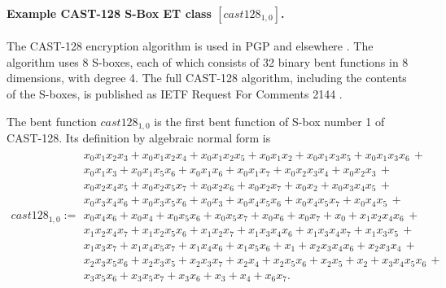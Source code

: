 \documentclass[12pt,a4paper]{article}
\begin{document}
\newpage
\paragraph*{Example CAST-128 S-Box ET class $[cast128_{1,0}]$.}

The CAST-128 encryption algorithm is used in PGP and elsewhere \cite{Ada97}.
The algorithm uses 8 S-boxes, each of which consists of 32 binary bent functions in 8 dimensions,
with degree 4.
The full CAST-128 algorithm, including the contents of the S-boxes,
is published as IETF Request For Comments 2144 \cite{RFC2144}.

The bent function $cast128_{1,0}$ is the first bent function of S-box number 1 of CAST-128.
Its definition by algebraic normal form is
\footnotesize{}
\begin{align*}
cast128_{1,0} :=
\begin{array}{l}
x_{0} x_{1} x_{2} x_{3} + x_{0} x_{1} x_{2} x_{4} + x_{0} x_{1} x_{2} x_{5} + x_{0} x_{1} x_{2} + x_{0} x_{1} x_{3} x_{5} + x_{0} x_{1} x_{3} x_{6}\, +
\\
x_{0} x_{1} x_{3} + x_{0} x_{1} x_{5} x_{6} + x_{0} x_{1} x_{6} + x_{0} x_{1} x_{7} + x_{0} x_{2} x_{3} x_{4} + x_{0} x_{2} x_{3}\, +
\\
x_{0} x_{2} x_{4} x_{5} + x_{0} x_{2} x_{5} x_{7} + x_{0} x_{2} x_{6} + x_{0} x_{2} x_{7} + x_{0} x_{2} + x_{0} x_{3} x_{4} x_{5}\, +
\\
x_{0} x_{3} x_{4} x_{6} + x_{0} x_{3} x_{5} x_{6} + x_{0} x_{3} + x_{0} x_{4} x_{5} x_{6} + x_{0} x_{4} x_{5} x_{7} + x_{0} x_{4} x_{5}\, +
\\
x_{0} x_{4} x_{6} + x_{0} x_{4} + x_{0} x_{5} x_{6} + x_{0} x_{5} x_{7} + x_{0} x_{6} + x_{0} x_{7} + x_{0} + x_{1} x_{2} x_{4} x_{6}\, +
\\
x_{1} x_{2} x_{4} x_{7} + x_{1} x_{2} x_{5} x_{6} + x_{1} x_{2} x_{7} + x_{1} x_{3} x_{4} x_{6} + x_{1} x_{3} x_{4} x_{7} + x_{1} x_{3} x_{5}\, +
\\
x_{1} x_{3} x_{7} + x_{1} x_{4} x_{5} x_{7} + x_{1} x_{4} x_{6} + x_{1} x_{5} x_{6} + x_{1} + x_{2} x_{3} x_{4} x_{6} + x_{2} x_{3} x_{4}\, +
\\
x_{2} x_{3} x_{5} x_{6} + x_{2} x_{3} x_{5} + x_{2} x_{3} x_{7} + x_{2} x_{4} + x_{2} x_{5} x_{6} + x_{2} x_{5} + x_{2} + x_{3} x_{4} x_{5} x_{6}\, +
\\
x_{3} x_{5} x_{6} + x_{3} x_{5} x_{7} + x_{3} x_{6} + x_{3} + x_{4} + x_{6} x_{7}.
\end{array}
\end{align*}
\normalsize{}
\end{document}
